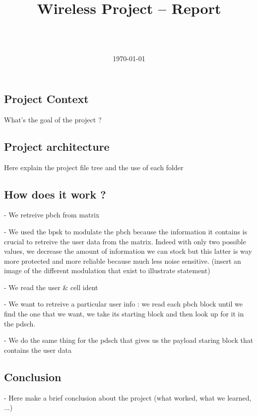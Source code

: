 \documentclass[a4paper, 12pt, twoside]{article}
\title{Wireless Project -- Report}
\author{
    \\ \NameA
    \\ \NameB
}
\date{
    \today
}
\begin{document}
    
    \maketitle

    \tableofcontents
    \newpage


    \begin{indt}{\section{Project Context}} %
        What's the goal of the project ?
    \end{indt}

    \begin{indt}{\section{Project architecture}}%
        Here explain the project file tree and the use of each folder
    \end{indt}%

    \begin{indt}{\section{How does it work ?}}%
        - We retreive pbch from matrix

        - We used the bpsk to modulate the pbch because the information it contains is crucial to retreive the user data from the matrix. Indeed with only two possible values, we decrease the amount of information we can stock but this latter is way more protected and more reliable because much less noise sensitive. (insert an image of the different modulation that exist to illustrate statement)

        - We read the user \& cell ident

        - We want to retreive a particular user info : we read each pbch block until we find the one that we want, we take its starting block and then look up for it in the pdsch.

        - We do the same thing for the pdsch that gives us the payload staring block that contains the user data
    \end{indt}%

    \begin{indt}{\section{Conclusion}}%
        - Here make a brief conclusion about the project (what worked, what we learned, ...)
    \end{indt}%
    
\end{document}

